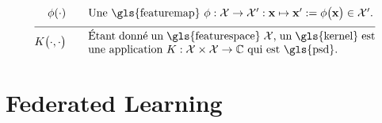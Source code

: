 \begin{align}
	\featuremap(\cdot)  \quad\quad & \parbox{.75\textwidth}{Une \gls{featuremap} $\featuremap: \featurespace \rightarrow \featurespace' : \featurevec \mapsto \featurevec' \defeq \featuremap\big( \featurevec \big) \in \featurespace'$.} \nonumber \\[2mm] \hline \nonumber\\[-5mm]
	\kernelmap{\cdot}{\cdot} \quad\quad & \parbox{.75\textwidth}{Étant donné un \gls{featurespace} $\featurespace$, un \gls{kernel} est une application $\kernel: \featurespace \times \featurespace \rightarrow \mathbb{C}$ qui est \gls{psd}.} \nonumber                                                                                                                                               
\end{align}
            






\newpage
\section*{Federated Learning}

